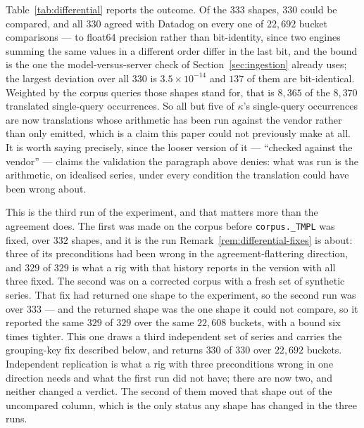Table~\ref{tab:differential} reports the outcome. Of the $333$ shapes, $330$ could be
compared, and all $330$ agreed with Datadog on every one of $22{,}692$ bucket
comparisons --- to float64 precision rather than bit-identity, since two engines summing
the same values in a different order differ in the last bit, and the bound is the one the
model-versus-server check of Section~\ref{sec:ingestion} already uses; the largest
deviation over all $330$ is $3.5\times10^{-14}$ and $137$ of them are bit-identical.
Weighted by the corpus queries those shapes stand for, that is $8{,}365$ of the
$8{,}370$ translated single-query occurrences. So all but five of $\kappa$'s single-query
occurrences are now translations whose arithmetic has been run against the vendor rather
than only emitted, which is a claim this paper could not previously make at all. It is
worth saying precisely, since the looser version of it --- ``checked against the
vendor'' --- claims the validation the paragraph above denies: what was run is the
arithmetic, on idealised series, under every condition the translation could have been
wrong about.

This is the third run of the experiment, and that matters more than the agreement does.
The first was made on the corpus before \texttt{corpus.\_TMPL} was fixed, over $332$
shapes, and it is the run Remark~\ref{rem:differential-fixes} is about: three of its
preconditions had been wrong in the agreement-flattering direction, and $329$ of $329$
is what a rig with that history reports in the version with all three fixed. The second
was on a corrected corpus with a fresh set of synthetic series. That fix had returned
one shape to the experiment, so the second run was over $333$ --- and the returned shape
was the one shape it could not compare, so it reported the same $329$ of $329$ over the
same $22{,}608$ buckets, with a bound six times tighter. This one draws a third
independent set of series and carries the grouping-key fix described below, and returns
$330$ of $330$ over $22{,}692$ buckets. Independent replication is what a rig with three
preconditions wrong in one direction needs and what the first run did not have; there
are now two, and neither changed a verdict. The second of them moved that shape out of
the uncompared column, which is the only status any shape has changed in the three
runs.

